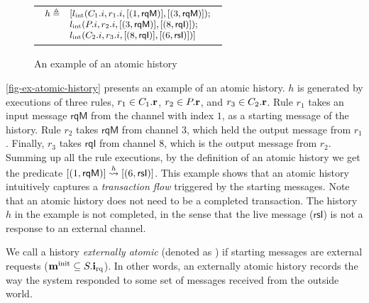 \begin{figure}[h]
\begin{tabular}{c}
\begin{tikzpicture}
    \end{tikzpicture}\\
    \hline
    \begin{math}
      \small
      \begin{array}{rl}
        h \triangleq & [\lblInt{\idxOf{C_1}}{\idxOf{r_1}}{\listsingle{(1, \textsf{rqM})}}{\listsingle{(3, \textsf{rqM})}};\\
        & \lblInt{\idxOf{P}}{\idxOf{r_2}}{\listsingle{(3, \textsf{rqM})}}{\listsingle{(8, \textsf{rqI})}};\\
        & \lblInt{\idxOf{C_2}}{\idxOf{r_3}}{\listsingle{(8, \textsf{rqI})}}{\listsingle{(6, \textsf{rsI})}}]\\
      \end{array}
    \end{math}
  \end{tabular}
  \caption{An example of an atomic history}
  \vspace{-5pt}
  \label{fig-ex-atomic-history}
\end{figure}

\autoref{fig-ex-atomic-history} presents an example of an atomic history.
$h$ is generated by executions of three rules, $r_1 \in \hobjrules{C_1}$, $r_2 \in \hobjrules{P}$, and $r_3 \in \hobjrules{C_2}$.
Rule $r_1$ takes an input message $\textsf{rqM}$ from the channel with index $1$, as a starting message of the history.
Rule $r_2$ takes $\textsf{rqM}$ from channel $3$, which held the output message from $r_1$.
Finally, $r_3$ takes $\textsf{rqI}$ from channel $8$, which is the output message from $r_2$.
Summing up all the rule executions, by the definition of an atomic history we get the predicate $\atomic{\listsingle{(1,\textsf{rqM})}}{h}{\listsingle{(6,\textsf{rsI})}}$.
This example shows that an atomic history intuitively captures a \emph{transaction flow} triggered by the starting messages.
Note that an atomic history does not need to be a completed transaction.
The history $h$ in the example is not completed, in the sense that the live message ($\textsf{rsI}$) is not a response to an external channel.

We call a history \emph{externally atomic} (denoted as ) if starting
messages are external requests ($\listof{\amsgi{m}} \subseteq \hsysRqA{S}$).
In other words, an externally atomic history records the way the system responded to some set of messages received from the outside world.

